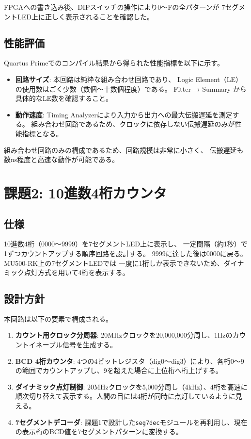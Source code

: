 \documentclass[a4paper,11pt]{ltjsarticle}
\begin{document}
FPGAへの書き込み後、DIPスイッチの操作により0〜Fの全パターンが
7セグメントLED上に正しく表示されることを確認した。

\subsection{性能評価}

Quartus Primeでのコンパイル結果から得られた性能指標を以下に示す。

\begin{itemize}
\item \textbf{回路サイズ}: 本回路は純粋な組み合わせ回路であり、
  Logic Element（LE）の使用数はごく少数（数個〜十数個程度）である。
  Fitter → Summary から具体的なLE数を確認すること。
\item \textbf{動作速度}: Timing Analyzerにより入力から出力への最大伝搬遅延を測定する。
  組み合わせ回路であるため、クロックに依存しない伝搬遅延のみが性能指標となる。
\end{itemize}

組み合わせ回路のみの構成であるため、回路規模は非常に小さく、
伝搬遅延も数ns程度と高速な動作が可能である。


\section{課題2: 10進数4桁カウンタ}

\subsection{仕様}

10進数4桁（0000〜9999）を7セグメントLED上に表示し、
一定間隔（約1秒）で1ずつカウントアップする順序回路を設計する。
9999に達した後は0000に戻る。MU500-RK上の7セグメントLEDでは
一度に1桁しか表示できないため、ダイナミック点灯方式を用いて4桁を表示する。

\subsection{設計方針}

本回路は以下の要素で構成される。

\begin{enumerate}
\item \textbf{カウント用クロック分周器}: 20MHzクロックを20,000,000分周し、1Hzのカウントイネーブル信号を生成する。
\item \textbf{BCD 4桁カウンタ}: 4つの4ビットレジスタ（dig0〜dig3）により、各桁0〜9の範囲でカウントアップし、9を超えた場合に上位桁へ桁上げする。
\item \textbf{ダイナミック点灯制御}: 20MHzクロックを5,000分周し（4kHz）、4桁を高速に順次切り替えて表示する。人間の目には4桁が同時に点灯しているように見える。
\item \textbf{7セグメントデコーダ}: 課題1で設計した\texttt{seg7dec}モジュールを再利用し、現在の表示桁のBCD値を7セグメントパターンに変換する。
\end{enumerate}
\end{document}
